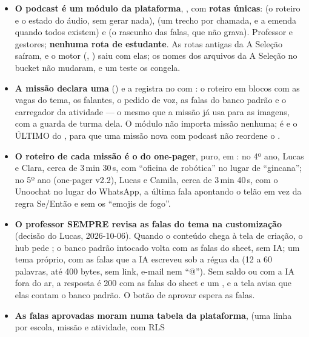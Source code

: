 \begin{itemize}
  \item \textbf{O podcast é um módulo da plataforma}, ,
    com \textbf{rotas únicas}:  (o
    roteiro e o estado do áudio, sem gerar nada),
     (um trecho por chamada, e a emenda quando todos
    existem) e  (o rascunho das falas, que não
    grava). Professor e gestores; \textbf{nenhuma rota de estudante}. As rotas
    antigas da A Seleção saíram, e o motor (,
    ) saiu com elas; os nomes dos arquivos da A
    Seleção no bucket não mudaram, e um teste os congela.
  \item \textbf{A missão declara uma }
    () e a registra no  com
    : o roteiro em blocos com as vagas do
    tema, os falantes, o pedido de voz, as falas do banco padrão e o
    carregador da atividade --- o mesmo que a missão já usa para as imagens,
    com a guarda de turma dela. O módulo  não importa missão
    nenhuma; é  e o ÚLTIMO do , para que uma
    missão nova com podcast não reordene o .
  \item \textbf{O roteiro de cada missão é o do one-pager}, puro, em
    : no 4º ano, Lucas e Clara, cerca de
    3\,min 30\,s, com \enquote{oficina de robótica} no lugar de
    \enquote{gincana}; no 5º ano (one-pager v2.2), Lucas e Camila, cerca de
    3\,min 40\,s, com o Unoochat no lugar do WhatsApp, a última fala apontando
    o telão em vez da regra Se/Então e sem os \enquote{emojis de fogo}.
  \item \textbf{O professor SEMPRE revisa as falas do tema na customização}
    (decisão do Lucas, 2026-10-06). Quando o conteúdo chega à tela de criação,
    o hub pede ; o banco padrão intocado volta com as falas
    do sheet, sem IA; um tema próprio, com as falas que a IA escreveu sob a
    régua da  (12 a 60 palavras, até 400 bytes, sem link,
    e-mail nem \enquote{@}). Sem saldo ou com a IA fora do ar, a resposta é
    200 com as falas do sheet e um , e a tela avisa que elas contam
    o banco padrão. O botão de aprovar espera as falas.
  \item \textbf{As falas aprovadas moram numa tabela da plataforma},
     (uma linha por escola, missão e atividade, com RLS

\end{itemize}
